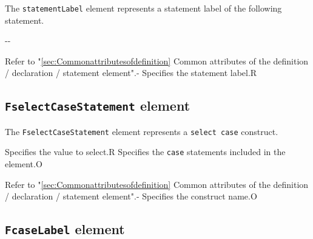 The {\tt statementLabel} element represents a statement label of the following statement.


\begin{XcodeMLChildElements}
\XcodeMLElementDef{-}
{-}{-}
\end{XcodeMLChildElements}

\begin{XcodeMLAttributes}
{Refer to "\ref{sec:Commonattributesofdefinition} Common attributes of the definition / declaration / statement element".}{-}
{Specifies the statement label.}{R}
\end{XcodeMLAttributes}


\subsection{ {\tt FselectCaseStatement} element}

The {\tt FselectCaseStatement} element represents a {\tt select case} construct.


\begin{XcodeMLChildElements}
{Specifies the value to select.}{R}
{Specifies the {\tt case} statements included in the element.}{O}
\end{XcodeMLChildElements}

\begin{XcodeMLAttributes}
{Refer to "\ref{sec:Commonattributesofdefinition} Common attributes of the definition / declaration / statement element".}{-}
{Specifies the construct name.}{O}
\end{XcodeMLAttributes}


\subsection{ {\tt FcaseLabel} element}

